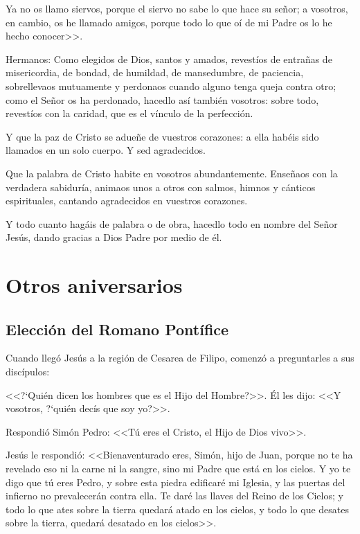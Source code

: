 Ya no os llamo siervos, porque 
el siervo no sabe lo que hace su señor; a 
vosotros, en cambio, os he llamado amigos, 
porque todo lo que oí de mi Padre os lo he 
hecho conocer>>. 


 Hermanos: Como elegidos de Dios, santos y 
amados, revestíos de entrañas de misericordia, 
de bondad, de humildad, de mansedumbre, de 
paciencia, 
sobrellevaos 
mutuamente 
y perdonaos cuando alguno tenga queja contra 
otro; como el Señor os ha perdonado, hacedlo 
así también vosotros: sobre todo, revestíos con 
la caridad, que es el vínculo de la perfección.  

Y 
que la paz de Cristo se adueñe de vuestros 
corazones: a ella habéis sido llamados en un 
solo cuerpo. Y sed agradecidos.  

Que la palabra 
de Cristo habite en vosotros abundantemente. 
Enseñaos con la verdadera sabiduría, animaos 
unos a otros con salmos, himnos y cánticos 
espirituales, cantando agradecidos en vuestros 
corazones. 

 Y todo cuanto hagáis de palabra o 
de obra, hacedlo todo en nombre del Señor 
Jesús, dando gracias a Dios Padre por medio 
de él.

\newpage
\section{Otros aniversarios}
\subsection{Elección del Romano Pontífice}

 Cuando llegó Jesús a la región de 
Cesarea de Filipo, comenzó a preguntarles a 
sus discípulos:  

<<?`Quién dicen los hombres que 
es el Hijo del Hombre?>>. Él les dijo: <<Y 
vosotros, ?`quién decís que soy yo?>>.  


Respondió Simón Pedro: <<Tú eres el Cristo, el 
Hijo de Dios vivo>>. 

 Jesús le respondió: 
<<Bienaventurado eres, Simón, hijo de Juan, 
porque no te ha revelado eso ni la carne ni la 
sangre, sino mi Padre que está en los cielos. Y 
yo te digo que tú eres Pedro, y sobre esta 
piedra edificaré mi Iglesia, y las puertas del 
infierno no prevalecerán contra ella. Te daré 
las llaves del Reino de los Cielos; y todo lo que 
ates sobre la tierra quedará atado en los cielos, 
y todo lo que desates sobre la tierra, quedará 
desatado en los cielos>>. 

